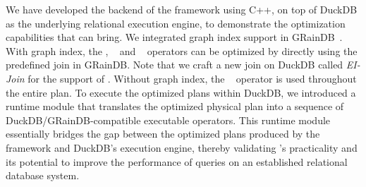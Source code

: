 We have developed the backend of the \name framework using C++, on top of DuckDB as the underlying relational execution engine, to demonstrate the optimization capabilities that \name can bring.
We integrated graph index support in GRainDB~\cite{graindb}. %
With graph index, the \expand, \expandedge~ and \getvertex~ operators can be optimized by directly using the predefined join in GRainDB.
Note that we craft a new join on DuckDB called \emph{EI-Join} for the support of \expandintersect.
Without graph index, the \hashjoin~ operator is used throughout the entire plan.
To execute the optimized plans within DuckDB, we introduced a runtime module that translates the optimized physical plan into a sequence of DuckDB/GRainDB-compatible executable operators.
This runtime module essentially bridges the gap between the optimized plans produced by the \name framework and DuckDB's execution engine, thereby validating \name's practicality and its potential to improve the performance of \spjm queries on an established relational database system.


